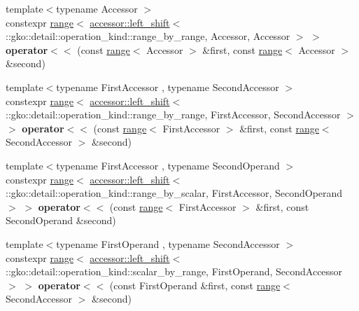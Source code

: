 \begin{DoxyCompactItemize}
\item 
\mbox{\label{namespacegko_a3a0fb3b3ff225d07950e27943d29593f}} 
{\footnotesize template$<$typename Accessor $>$ }\\constexpr \hyperlink{classgko_1_1range}{range}$<$ \hyperlink{structgko_1_1accessor_1_1left__shift}{accessor\+::left\+\_\+shift}$<$ \+::gko\+::detail\+::operation\+\_\+kind\+::range\+\_\+by\+\_\+range, Accessor, Accessor $>$ $>$ {\bfseries operator$<$$<$} (const \hyperlink{classgko_1_1range}{range}$<$ Accessor $>$ \&first, const \hyperlink{classgko_1_1range}{range}$<$ Accessor $>$ \&second)
\item 
\mbox{\label{namespacegko_a6d7500d198bc217d251346560148657e}} 
{\footnotesize template$<$typename First\+Accessor , typename Second\+Accessor $>$ }\\constexpr \hyperlink{classgko_1_1range}{range}$<$ \hyperlink{structgko_1_1accessor_1_1left__shift}{accessor\+::left\+\_\+shift}$<$ \+::gko\+::detail\+::operation\+\_\+kind\+::range\+\_\+by\+\_\+range, First\+Accessor, Second\+Accessor $>$ $>$ {\bfseries operator$<$$<$} (const \hyperlink{classgko_1_1range}{range}$<$ First\+Accessor $>$ \&first, const \hyperlink{classgko_1_1range}{range}$<$ Second\+Accessor $>$ \&second)
\item 
\mbox{\label{namespacegko_a34302fcd90695bfd2e0267da0454c8b9}} 
{\footnotesize template$<$typename First\+Accessor , typename Second\+Operand $>$ }\\constexpr \hyperlink{classgko_1_1range}{range}$<$ \hyperlink{structgko_1_1accessor_1_1left__shift}{accessor\+::left\+\_\+shift}$<$ \+::gko\+::detail\+::operation\+\_\+kind\+::range\+\_\+by\+\_\+scalar, First\+Accessor, Second\+Operand $>$ $>$ {\bfseries operator$<$$<$} (const \hyperlink{classgko_1_1range}{range}$<$ First\+Accessor $>$ \&first, const Second\+Operand \&second)
\item 
\mbox{\label{namespacegko_aeeaf5e40ac6cca7985630beed38975e0}} 
{\footnotesize template$<$typename First\+Operand , typename Second\+Accessor $>$ }\\constexpr \hyperlink{classgko_1_1range}{range}$<$ \hyperlink{structgko_1_1accessor_1_1left__shift}{accessor\+::left\+\_\+shift}$<$ \+::gko\+::detail\+::operation\+\_\+kind\+::scalar\+\_\+by\+\_\+range, First\+Operand, Second\+Accessor $>$ $>$ {\bfseries operator$<$$<$} (const First\+Operand \&first, const \hyperlink{classgko_1_1range}{range}$<$ Second\+Accessor $>$ \&second)

\end{DoxyCompactItemize}
